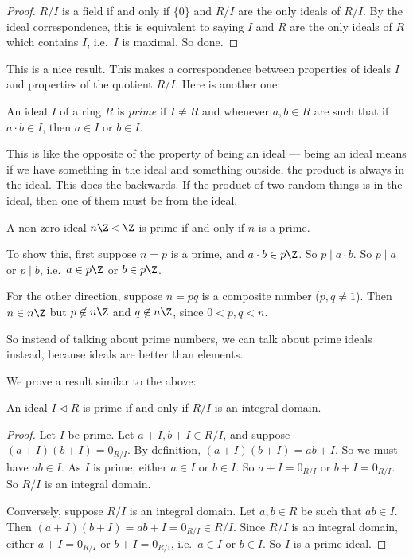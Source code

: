 \documentclass[a4paper]{article}
\begin{document}
\begin{proof}
  $R/I$ is a field if and only if $\{0\}$ and $R/I$ are the only ideals of $R/I$. By the ideal correspondence, this is equivalent to saying $I$ and $R$ are the only ideals of $R$ which contains $I$, i.e.\ $I$ is maximal. So done.
\end{proof}
This is a nice result. This makes a correspondence between properties of ideals $I$ and properties of the quotient $R/I$. Here is another one:

\begin{defi}
  An ideal $I$ of a ring $R$ is \emph{prime} if $I \not= R$ and whenever $a, b \in R$ are such that if $a\cdot b \in I$, then $a \in I$ or $b \in I$.
\end{defi}

This is like the opposite of the property of being an ideal --- being an ideal means if we have something in the ideal and something outside, the product is always in the ideal. This does the backwards. If the product of two random things is in the ideal, then one of them must be from the ideal.

\begin{eg}
  A non-zero ideal $n\Z \lhd \Z$ is prime if and only if $n$ is a prime.

  To show this, first suppose $n = p$ is a prime, and $a\cdot b \in p\Z$. So $p \mid a\cdot b$. So $p \mid a$ or $p \mid b$, i.e.\ $a \in p\Z$ or $b \in p\Z$.

  For the other direction, suppose $n = pq$ is a composite number ($p, q \not= 1$). Then $n \in n\Z$ but $p \not\in n\Z$ and $q \not\in n\Z$, since $0 < p, q < n$.
\end{eg}
So instead of talking about prime numbers, we can talk about prime ideals instead, because ideals are better than elements.

We prove a result similar to the above:
\begin{lemma}
  An ideal $I \lhd R$ is prime if and only if $R/I$ is an integral domain.
\end{lemma}

\begin{proof}
  Let $I$ be prime. Let $a + I, b + I \in R/I$, and suppose $(a + I)(b + I) = 0_{R/I}$. By definition, $(a + I)(b + I) = ab + I$. So we must have $ab \in I$. As $I$ is prime, either $a \in I$ or $b \in I$. So $a + I = 0_{R/I}$ or $b + I = 0_{R/I}$. So $R/I$ is an integral domain.

  Conversely, suppose $R/I$ is an integral domain. Let $a, b \in R$ be such that $ab \in I$. Then $(a + I)(b + I) = ab + I = 0_{R/I} \in R/I$. Since $R/I$ is an integral domain, either $a + I = 0_{R/I}$ or $b + I = 0_{R/i}$, i.e.\ $a \in I$ or $b\in I$. So $I$ is a prime ideal.
\end{proof}
\end{document}
